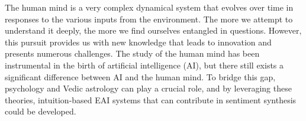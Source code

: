The human mind is a very complex dynamical system that evolves over time in responses to the various inputs from the environment. The more we attempt to understand it deeply, the more we find ourselves entangled in questions. However, this pursuit provides us with new knowledge that leads to innovation and presents numerous challenges. The study of the human mind has been instrumental in the birth of artificial intelligence (AI), but there still exists a significant difference between AI and the human mind. To bridge this gap, psychology and Vedic astrology can play a crucial role, and by leveraging these theories, intuition-based EAI systems that can contribute in sentiment synthesis could be developed.
\vspace{1\baselineskip}